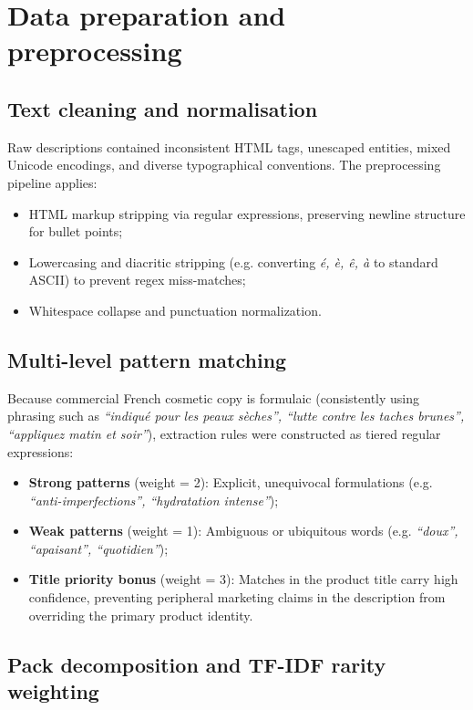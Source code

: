 \section{Data preparation and preprocessing}

\subsection{Text cleaning and normalisation}

Raw descriptions contained inconsistent HTML tags, unescaped entities, mixed Unicode encodings, and diverse typographical conventions. The preprocessing pipeline applies:
\begin{itemize}
  \item HTML markup stripping via regular expressions, preserving newline structure for bullet points;
  \item Lowercasing and diacritic stripping (e.g. converting \emph{é, è, ê, à} to standard ASCII) to prevent regex miss-matches;
  \item Whitespace collapse and punctuation normalization.
\end{itemize}

\subsection{Multi-level pattern matching}

Because commercial French cosmetic copy is formulaic (consistently using phrasing such as \emph{``indiqué pour les peaux sèches'', ``lutte contre les taches brunes'', ``appliquez matin et soir''}), extraction rules were constructed as tiered regular expressions:
\begin{itemize}
  \item \textbf{Strong patterns} (weight = 2): Explicit, unequivocal formulations (e.g. \emph{``anti-imperfections'', ``hydratation intense''});
  \item \textbf{Weak patterns} (weight = 1): Ambiguous or ubiquitous words (e.g. \emph{``doux'', ``apaisant'', ``quotidien''});
  \item \textbf{Title priority bonus} (weight = 3): Matches in the product title carry high confidence, preventing peripheral marketing claims in the description from overriding the primary product identity.
\end{itemize}

\subsection{Pack decomposition and TF-IDF rarity weighting}

